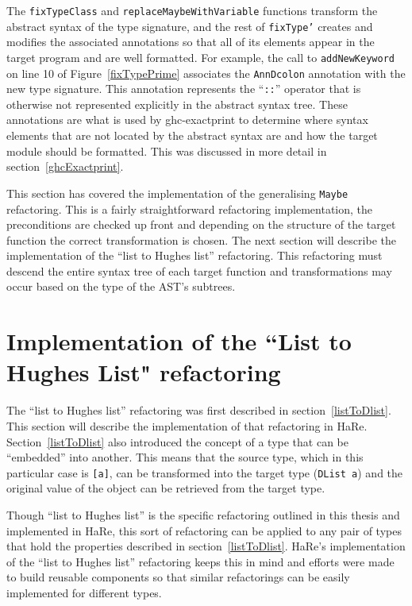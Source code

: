 The \texttt{fixTypeClass} and \texttt{replaceMaybeWithVariable} functions transform the abstract syntax of the type signature, and the rest of \texttt{fixType'} creates and modifies the associated annotations so that all of its elements appear in the target program and are well formatted. For example, the call to \texttt{addNewKeyword} on line 10 of Figure~\ref{fixTypePrime} associates the \texttt{AnnDcolon} annotation with the new type signature. This annotation represents the ``\texttt{::}'' operator that is otherwise not represented explicitly in the abstract syntax tree. These annotations are what is used by ghc-exactprint to determine where syntax elements that are not located by the abstract syntax are and how the target module should be formatted. This was discussed in more detail in section~\ref{ghcExactprint}.

This section has covered the implementation of the generalising \texttt{Maybe} refactoring. This is a fairly straightforward refactoring implementation, the preconditions are checked up front and depending on the structure of the target function the correct transformation is chosen. The next section will describe the implementation of the ``list to Hughes list'' refactoring. This refactoring must descend the entire syntax tree of each target function and transformations may occur based on the type of the AST's subtrees.  

\section{Implementation of the ``List to Hughes List" refactoring}
\label{sec:hughesListImp}

The ``list to Hughes list'' refactoring was first described in section~\ref{listToDlist}. This section will describe the implementation of that refactoring in HaRe. Section~\ref{listToDlist} also introduced the concept of a type that can be ``embedded'' into another. This means that the source type, which in this particular case is \texttt{[a]}, can be transformed into the target type (\texttt{DList a}) and the original value of the object can be retrieved from the target type.

Though ``list to Hughes list'' is the specific refactoring outlined in this thesis and implemented in HaRe, this sort of refactoring can be applied to any pair of types that hold the properties described in section~\ref{listToDlist}. HaRe's implementation of the ``list to Hughes list'' refactoring keeps this in mind and efforts were made to build reusable components so that similar refactorings can be easily implemented for different types.

